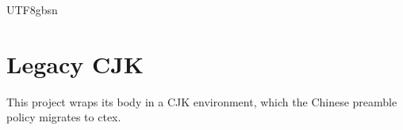 \documentclass[11pt]{article}
\begin{document}
\begin{CJK*}{UTF8}{gbsn}
\section{Legacy CJK}
This project wraps its body in a CJK environment, which the Chinese preamble policy migrates to ctex.
\end{CJK*}
\end{document}
